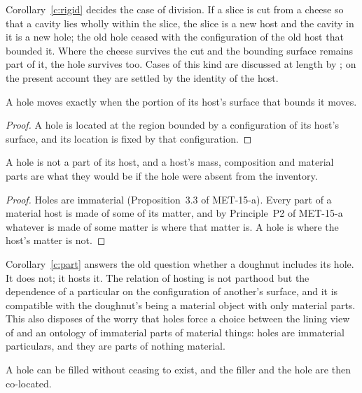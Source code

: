 \documentclass{situationist-preprint}
\begin{document}
Corollary~\ref{c:rigid} decides the case of division. If a slice is cut from a cheese so that a cavity lies wholly within the slice, the slice is a new host and the cavity in it is a new hole; the old hole ceased with the configuration of the old host that bounded it. Where the cheese survives the cut and the bounding surface remains part of it, the hole survives too. Cases of this kind are discussed at length by \citet{CasatiVarzi1994}; on the present account they are settled by the identity of the host.

\begin{corollary}[Co-motion]\label{c:motion}
A hole moves exactly when the portion of its host's surface that bounds it moves.
\end{corollary}

\begin{proof}
A hole is located at the region bounded by a configuration of its host's surface, and its location is fixed by that configuration.
\end{proof}

\begin{corollary}\label{c:part}
A hole is not a part of its host, and a host's mass, composition and material parts are what they would be if the hole were absent from the inventory.
\end{corollary}

\begin{proof}
Holes are immaterial (Proposition~3.3 of MET-15-a). Every part of a material host is made of some of its matter, and by Principle~P2 of MET-15-a whatever is made of some matter is where that matter is. A hole is where the host's matter is not.
\end{proof}

Corollary~\ref{c:part} answers the old question whether a doughnut includes its hole. It does not; it hosts it. The relation of hosting is not parthood but the dependence of a particular on the configuration of another's surface, and it is compatible with the doughnut's being a material object with only material parts. This also disposes of the worry that holes force a choice between the lining view of \citet{LewisLewis1970} and an ontology of immaterial parts of material things: holes are immaterial particulars, and they are parts of nothing material.

\begin{corollary}\label{c:fill}
A hole can be filled without ceasing to exist, and the filler and the hole are then co-located.
\end{corollary}
\end{document}
